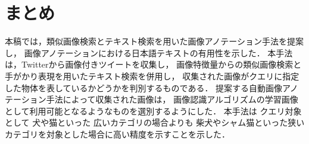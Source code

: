\chapter{まとめ}
\label{sec:format}
本稿では，類似画像検索とテキスト検索を用いた画像アノテーション手法を提案し，
画像アノテーションにおける日本語テキストの有用性を示した．
本手法は，Twitterから画像付きツイートを収集し，
画像特徴量からの類似画像検索と手がかり表現を用いたテキスト検索を併用し，
収集された画像がクエリに指定した物体を表しているかどうかを判別するものである．
提案する自動画像アノテーション手法によって収集された画像は，
画像認識アルゴリズムの学習画像として利用可能となるようなものを選別するようにした．
本手法は
クエリ対象として
犬や猫といった
広いカテゴリの場合よりも
柴犬やシャム猫といった狭いカテゴリを対象とした場合に高い精度を示すことを示した．
